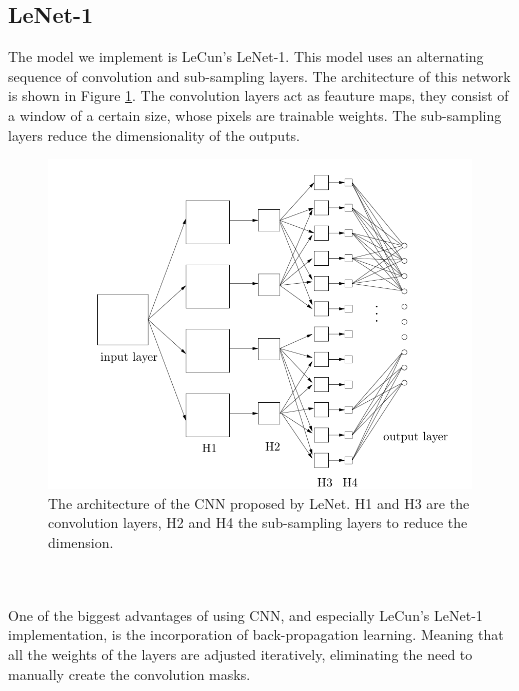 \documentclass[a4paper,onecolumn]{report}
\begin{document}
\subsection{LeNet-1}
The model we implement is LeCun's LeNet-1. This model uses an alternating sequence of convolution and sub-sampling layers. The architecture of this network is shown in Figure \ref{fig:Architecture}. The convolution layers act as feauture maps, they consist of a window of a certain size, whose pixels are trainable weights. The sub-sampling layers reduce the dimensionality of the outputs. 
\begin{figure}[h!]
    \centering
    \includegraphics[scale=0.4]{./images/Architecture_CNN.png}
    \caption{The architecture of the CNN proposed by LeNet. H1 and H3 are the convolution layers, H2 and H4 the sub-sampling layers to reduce the dimension.  }
	\label{fig:Architecture}
\end{figure}
\\\\
One of the biggest advantages of using CNN, and especially LeCun's LeNet-1 implementation, is the incorporation of back-propagation learning. Meaning that all the weights of the layers are adjusted iteratively, eliminating the need to manually create the convolution masks.
\\
\end{document}
